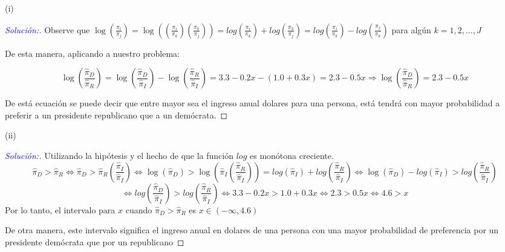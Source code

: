 \documentclass[12pt,a4paper,oneside]{article}
\begin{document}
\begin{compactenum}
\item[(i)] 
\begin{proof}[\textcolor{blue}{Solución:}] Observe que $\log\left(\frac{\pi_i}{\pi_j}\right) = \log(\left(\frac{\pi_i}{\pi_k}\right)\left(\frac{\pi_k}{\pi_j}\right)) = log\left(\frac{\pi_i}{\pi_k}\right) + log\left(\frac{\pi_k}{\pi_j}\right) = log\left(\frac{\pi_i}{\pi_k}\right) - log\left(\frac{\pi_j}{\pi_k}\right)$ para algún $k = 1, 2, \dots , J$

De esta manera, aplicando a nuestro problema:

$$\log\left(\frac{\widehat{\pi}_D}{\widehat{\pi}_R}\right) = \log\left(\frac{\widehat{\pi}_D}{\widehat{\pi}_I}\right) - \log\left(\frac{\widehat{\pi}_R}{\widehat{\pi}_I}\right) = 3.3 - 0.2 x - (1.0 + 0.3 x) = 2.3 - 0.5 x \Rightarrow \log\left(\frac{\widehat{\pi}_D}{\widehat{\pi}_R}\right) = 2.3 - 0.5 x$$

De está ecuación se puede decir que entre mayor sea el ingreso anual dolares para una persona, está tendrá con mayor probabilidad a preferir a un presidente republicano que a un demócrata.

\end{proof}

\item[(ii)]
\begin{proof}[\textcolor{blue}{Solución:}] Utilizando la hipótesis y el hecho de que la función $log$ es monótona creciente.
$$ \widehat{\pi}_D > \widehat{\pi}_R \Leftrightarrow \widehat{\pi}_D > \widehat{\pi}_R \left( \frac{\widehat{\pi}_I}{\widehat{\pi}_I} \right) \Leftrightarrow \log \left( \widehat{\pi}_D \right) > \log \left( \widehat{\pi}_I \left( \frac{\widehat{\pi}_R}{\widehat{\pi}_I} \right) \right) = log \left( \widehat{\pi}_I \right) + log \left( \frac{\widehat{\pi}_R}{\widehat{\pi}_I} \right) \Leftrightarrow \log \left( \widehat{\pi}_D \right) - log \left( \widehat{\pi}_I \right) > log \left( \frac{\widehat{\pi}_R}{\widehat{\pi}_I} \right) $$
$$\Leftrightarrow log \left( \frac{\widehat{\pi}_D}{\widehat{\pi}_I} \right) > log \left( \frac{\widehat{\pi}_R}{\widehat{\pi}_I} \right) \Leftrightarrow 3.3 - 0.2 x > 1.0 + 0.3 x \Leftrightarrow 2.3 > 0.5x \Leftrightarrow 4.6 > x$$
Por lo tanto, el intervalo para $x$ cuando $ \widehat{\pi}_D > \widehat{\pi}_R$ es $x \in{(-\infty,4.6)}$

De otra manera, este intervalo significa el ingreso anual en dolares de una persona con una mayor probabilidad de preferencia por un presidente demócrata que por un republicano


\end{proof}
\end{compactenum}
\end{document}
